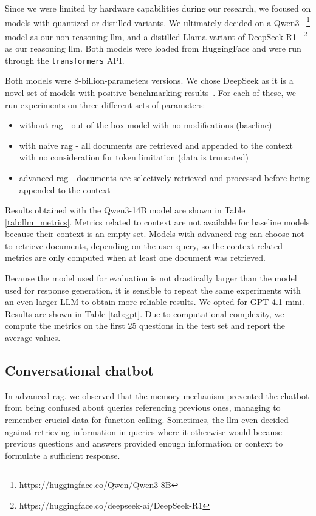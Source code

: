 \documentclass[fleqn,moreauthors,10pt]{ds_report}
\begin{document}
Since we were limited by hardware capabilities during our research, we focused on models with quantized or distilled variants. We ultimately decided on a Qwen3 \cite{qwen3}~\footnote{https://huggingface.co/Qwen/Qwen3-8B} model as our non-reasoning \ac{llm}, and a distilled Llama variant of DeepSeek R1 \cite{deepseek3}~\footnote{https://huggingface.co/deepseek-ai/DeepSeek-R1} as our reasoning \ac{llm}. Both models were loaded from HuggingFace and were run through the \texttt{transformers} API.

Both models were 8-billion-parameters versions. We chose DeepSeek as it is a novel set of models with positive benchmarking results~\cite{deepseek3}. For each of these, we run experiments on three different sets of parameters:
\begin{itemize}
\setlength\itemsep{-0.3em}
    \item without \ac{rag} - out-of-the-box model with no modifications (baseline)
    \item with naive \ac{rag} - all documents are retrieved and appended to the context with no consideration for token limitation (data is truncated)
    \item advanced \ac{rag} - documents are selectively retrieved and processed before being appended to the context
\end{itemize}

Results obtained with the Qwen3-14B model are shown in Table \ref{tab:llm_metrics}. Metrics related to context are not available for baseline models because their context is an empty set. Models with advanced \ac{rag} can choose not to retrieve documents, depending on the user query, so the context-related metrics are only computed when at least one document was retrieved.

Because the model used for evaluation is not drastically larger than the model used for response generation, it is sensible to repeat the same experiments with an even larger LLM to obtain more reliable results. We opted for GPT-4.1-mini. Results are shown in Table \ref{tab:gpt}. Due to computational complexity, we compute the metrics on the first 25 questions in the test set and report the average values. 

\subsection*{Conversational chatbot}
In advanced \ac{rag}, we observed that the memory mechanism prevented the chatbot from being confused about queries referencing previous ones, managing to remember crucial data for function calling. Sometimes, the \ac{llm} even decided against retrieving information in queries where it otherwise would because previous questions and answers provided enough information or context to formulate a sufficient response.
\end{document}

